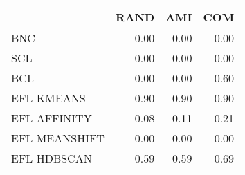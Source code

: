 \begin{tabular}{lrrr}
\toprule
 & RAND & AMI & COM \\
\midrule
BNC & 0.00 & 0.00 & 0.00 \\
SCL & 0.00 & 0.00 & 0.00 \\
BCL & 0.00 & -0.00 & 0.60 \\
EFL-KMEANS & 0.90 & 0.90 & 0.90 \\
EFL-AFFINITY & 0.08 & 0.11 & 0.21 \\
EFL-MEANSHIFT & 0.00 & 0.00 & 0.00 \\
EFL-HDBSCAN & 0.59 & 0.59 & 0.69 \\
\bottomrule
\end{tabular}
